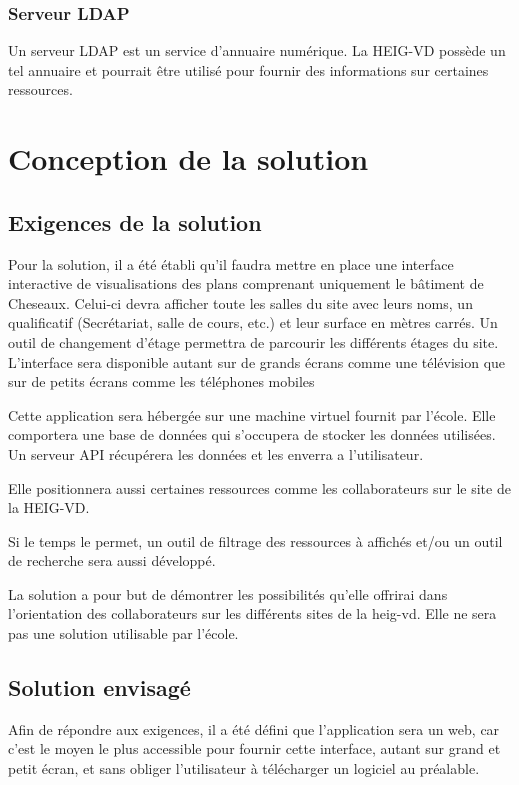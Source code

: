 \documentclass[
    iai, %
    il, %
]{heig-tb}
\begin{document}
\subsection{Serveur LDAP}
Un serveur LDAP est un service d'annuaire numérique.
La HEIG-VD possède un tel annuaire et pourrait être utilisé pour fournir des informations sur certaines ressources.

\chapter{Conception de la solution}

\section{Exigences de la solution}
Pour la solution, il a été établi qu'il faudra mettre en place une interface interactive de visualisations des plans comprenant uniquement le bâtiment de Cheseaux.
Celui-ci devra afficher toute les salles du site avec leurs noms, un qualificatif (Secrétariat, salle de cours, etc.) et leur surface en mètres carrés.
Un outil de changement d'étage permettra de parcourir les différents étages du site.
L'interface sera disponible autant sur de grands écrans comme une télévision que sur de petits écrans comme les téléphones mobiles

Cette application sera hébergée sur une machine virtuel fournit par l'école.
Elle comportera une base de données qui s'occupera de stocker les données utilisées.
Un serveur API récupérera les données et les enverra a l'utilisateur.

Elle positionnera aussi certaines ressources comme les collaborateurs sur le site de la HEIG-VD.

Si le temps le permet, un outil de filtrage des ressources à affichés et/ou un outil de recherche sera aussi développé.

La solution a pour but de démontrer les possibilités qu'elle offrirai dans l'orientation des collaborateurs sur les différents sites de la \gls{heig-vd}.
Elle ne sera pas une solution utilisable par l'école.

\section{Solution envisagé}
Afin de répondre aux exigences, il a été défini que l'application sera un web,
car c'est le moyen le plus accessible pour fournir cette interface, autant sur grand et petit écran,
et sans obliger l'utilisateur à télécharger un logiciel au préalable.
\end{document}
